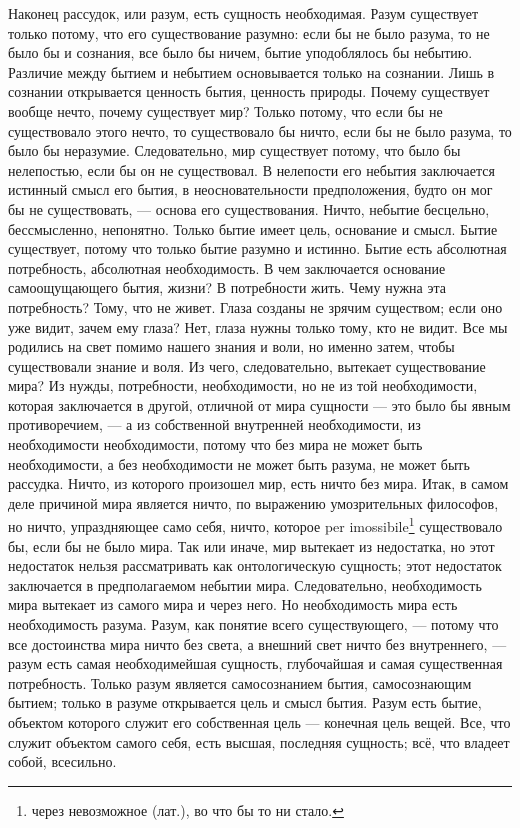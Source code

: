 \documentclass[12pt,oneside]{book}
\begin{document}
Наконец рассудок, или разум, есть сущность необходимая. Разум существует только потому, что его существование разумно: если бы не было разума, то не было бы и сознания, все было бы ничем, бытие уподоблялось бы небытию. Различие между бытием и небытием основывается только на сознании. Лишь в сознании открывается ценность бытия, ценность природы. Почему существует вообще нечто, почему существует мир? Только потому, что если бы не существовало этого нечто, то существовало бы ничто, если бы не было разума, то было бы неразумие. Следовательно, мир существует потому, что было бы нелепостью, если бы он не существовал. В нелепости его небытия заключается истинный смысл его бытия, в неосновательности предположения, будто он мог бы не существовать, --- основа его существования. Ничто, небытие бесцельно, бессмысленно, непонятно. Только бытие имеет цель, основание и смысл. Бытие существует, потому что только бытие разумно и истинно. Бытие есть абсолютная потребность, абсолютная необходимость. В чем заключается основание самоощущающего бытия, жизни? В потребности жить. Чему нужна эта потребность? Тому, что не живет. Глаза созданы не зрячим существом; если оно уже видит, зачем ему глаза? Нет, глаза нужны только тому, кто не видит. Все мы родились на свет помимо нашего знания и воли, но именно затем, чтобы существовали знание и воля. Из чего, следовательно, вытекает существование мира? Из нужды, потребности, необходимости, но не из той необходимости, которая заключается в другой, отличной от мира сущности --- это было бы явным противоречием, --- а из собственной внутренней необходимости, из необходимости необходимости, потому что без мира не может быть необходимости, а без необходимости не может быть разума, не может быть рассудка. Ничто, из которого произошел мир, есть ничто без мира. Итак, в самом деле причиной мира является ничто, по выражению умозрительных философов, но ничто, упраздняющее само себя, ничто, которое per imossibile\footnote{через невозможное (лат.), во что бы то ни стало.} существовало бы, если бы не было мира. Так или иначе, мир вытекает из недостатка, но этот недостаток нельзя рассматривать как онтологическую сущность; этот недостаток заключается в предполагаемом небытии мира. Следовательно, необходимость мира вытекает из самого мира и через него. Но необходимость мира есть необходимость разума. Разум, как понятие всего существующего, --- потому что все достоинства мира ничто без света, а внешний свет ничто без внутреннего, --- разум есть самая необходимейшая сущность, глубочайшая и самая существенная потребность. Только разум является самосознанием бытия, самосознающим бытием; только в разуме открывается цель и смысл бытия. Разум есть бытие, объектом которого служит его собственная цель --- конечная цель вещей. Все, что служит объектом самого себя, есть высшая, последняя сущность; всё, что владеет собой, всесильно.
\end{document}

